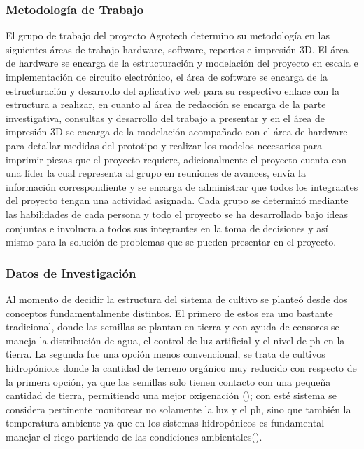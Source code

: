 \subsubsection{Metodología de Trabajo}

\noindent El grupo de trabajo del proyecto Agrotech determino su metodología en
las siguientes áreas de trabajo hardware, software, reportes e impresión 3D. El
área de hardware se encarga de la estructuración y modelación del proyecto en
escala e implementación de circuito electrónico, el área de software se encarga
de la estructuración y desarrollo del aplicativo web para su respectivo enlace
con la estructura a realizar, en cuanto al área de redacción se encarga de la
parte investigativa, consultas y desarrollo del trabajo a presentar y en el
área de impresión 3D se encarga de la modelación acompañado con el área de
hardware para detallar medidas del prototipo y realizar los modelos necesarios
para imprimir piezas que el proyecto requiere, adicionalmente el proyecto
cuenta con una líder la cual representa al grupo en reuniones de avances, envía
la información correspondiente y se encarga de administrar que todos los
integrantes del proyecto tengan una actividad asignada. Cada grupo se determinó
mediante las habilidades de cada persona y todo el proyecto se ha desarrollado
bajo ideas conjuntas e involucra a todos sus integrantes en la toma de
decisiones y así mismo para la solución de problemas que se pueden presentar en
el proyecto.

\subsubsection{Datos de Investigación}

\noindent Al momento de decidir la estructura del sistema de cultivo se planteó
desde dos conceptos fundamentalmente distintos. El primero de estos era uno
bastante tradicional, donde las semillas se plantan en tierra y con ayuda de
censores se maneja la distribución de agua, el control de luz artificial y el
nivel de ph en la tierra. La segunda fue una opción menos convencional, se
trata de cultivos hidropónicos donde la cantidad de terreno orgánico muy
reducido con respecto de la primera opción, ya que las semillas solo tienen
contacto con una pequeña cantidad de tierra, permitiendo una mejor oxigenación
(\cite{usatoday2019}); con esté sistema se considera pertinente monitorear no
solamente la luz y el ph, sino que también la temperatura ambiente ya que en
los sistemas hidropónicos es fundamental manejar el riego partiendo de las
condiciones ambientales(\cite{cabazas2020}).

